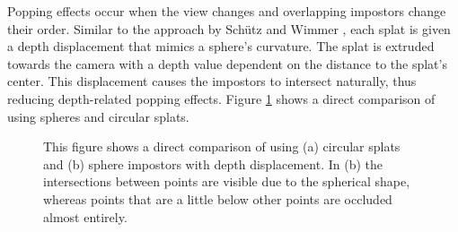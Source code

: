\par

Popping effects occur when the view changes and overlapping impostors change their order. Similar to the approach by Schütz and Wimmer \cite{SCHUETZ-2015-HQP}, each splat is given a depth displacement that mimics a sphere's curvature. The splat is extruded towards the camera with a depth value dependent on the distance to the splat's center. This displacement causes the impostors to intersect naturally, thus reducing depth-related popping effects. Figure \ref{fig:point_sprites} shows a direct comparison of using spheres and circular splats. 


\begin{figure}
\centering
{}
  
\caption[Comparison of (a) circular splats and (b) sphere impostors]
{This figure shows a direct comparison of using (a) circular splats and (b) sphere impostors with depth displacement. In (b) the intersections between points are visible due to the spherical shape, whereas points that are a little below other points are occluded almost entirely.}
\label{fig:point_sprites}
\end{figure}